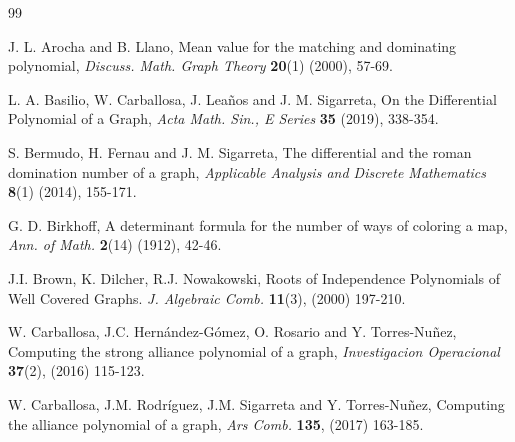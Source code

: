\documentclass[review]{elsarticle}
\begin{document}
\begin{thebibliography}{99}


 J. L. Arocha and B. Llano, Mean value for the matching and dominating polynomial, {\it Discuss. Math. Graph Theory} {\bf 20}(1) (2000), 57-69.

 L. A. Basilio, W. Carballosa, J. Lea\~nos and J. M. Sigarreta, On the Differential Polynomial of a Graph, {\it Acta Math. Sin., E Series} {\bf 35} (2019), 338-354. 




 S. Bermudo, H. Fernau and J. M. Sigarreta, The differential and the roman domination number of a graph, {\it Applicable Analysis and Discrete Mathematics} {\bf 8}(1) (2014), 155-171.

  G. D. Birkhoff, A determinant formula for the number of ways of coloring a map, {\it Ann. of Math.} {\bf 2}(14) (1912), 42-46.


 J.I. Brown, K. Dilcher, R.J. Nowakowski, Roots of Independence Polynomials of Well Covered Graphs. {\it J. Algebraic Comb.} {\bf 11}(3), (2000) 197-210.

 W. Carballosa, J.C. Hern\'andez-G\'omez, O. Rosario and Y. Torres-Nu\~nez, Computing the strong alliance polynomial of a graph, {\it Investigacion Operacional} {\bf{37}}(2), (2016) 115-123.

 W. Carballosa, J.M. Rodr\'iguez, J.M. Sigarreta and Y. Torres-Nu\~nez, Computing the alliance polynomial of a graph, {\it Ars Comb.} {\bf 135}, (2017) 163-185.



\end{thebibliography}
\end{document}

